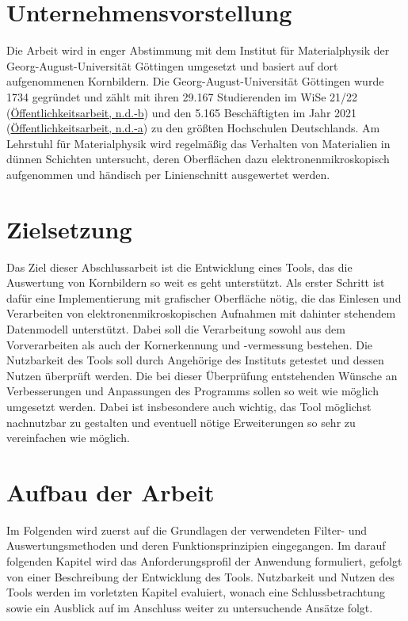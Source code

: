 \documentclass[
  12pt,
  openany]{book}
\begin{document}
\hypertarget{unternehmensvorstellung}{%
\section{Unternehmensvorstellung}\label{unternehmensvorstellung}}

Die Arbeit wird in enger Abstimmung mit dem Institut für Materialphysik der Georg-August-Universität Göttingen umgesetzt und basiert auf dort aufgenommenen Kornbildern.
Die Georg-August-Universität Göttingen wurde 1734 gegründet und zählt mit ihren 29.167 Studierenden im WiSe 21/22 (\protect\hyperlink{ref-offentlichkeitsarbeitStudiumUndLehre}{Öffentlichkeitsarbeit, n.d.-b}) und den 5.165 Beschäftigten im Jahr 2021 (\protect\hyperlink{ref-offentlichkeitsarbeitPersonalGeorgAugustUniversitatGottingen}{Öffentlichkeitsarbeit, n.d.-a}) zu den größten Hochschulen Deutschlands. Am Lehrstuhl für Materialphysik wird regelmäßig das Verhalten von Materialien in dünnen Schichten untersucht, deren Oberflächen dazu elektronenmikroskopisch aufgenommen und händisch per Linienschnitt ausgewertet werden.

\hypertarget{zielsetzung}{%
\section{Zielsetzung}\label{zielsetzung}}

Das Ziel dieser Abschlussarbeit ist die Entwicklung eines Tools, das die Auswertung von Kornbildern so weit es geht unterstützt.
Als erster Schritt ist dafür eine Implementierung mit grafischer Oberfläche nötig, die das Einlesen und Verarbeiten von elektronenmikroskopischen Aufnahmen mit dahinter stehendem Datenmodell unterstützt.
Dabei soll die Verarbeitung sowohl aus dem Vorverarbeiten als auch der Kornerkennung und -vermessung bestehen.
Die Nutzbarkeit des Tools soll durch Angehörige des Instituts getestet und dessen Nutzen überprüft werden. Die bei dieser Überprüfung entstehenden Wünsche an Verbesserungen und Anpassungen des Programms sollen so weit wie möglich umgesetzt werden.
Dabei ist insbesondere auch wichtig, das Tool möglichst nachnutzbar zu gestalten und eventuell nötige Erweiterungen so sehr zu vereinfachen wie möglich.

\hypertarget{aufbau-der-arbeit}{%
\section{Aufbau der Arbeit}\label{aufbau-der-arbeit}}

Im Folgenden wird zuerst auf die Grundlagen der verwendeten Filter- und Auswertungsmethoden und deren Funktionsprinzipien eingegangen.
Im darauf folgenden Kapitel wird das Anforderungsprofil der Anwendung formuliert, gefolgt von einer Beschreibung der Entwicklung des Tools.
Nutzbarkeit und Nutzen des Tools werden im vorletzten Kapitel evaluiert, wonach eine Schlussbetrachtung sowie ein Ausblick auf im Anschluss weiter zu untersuchende Ansätze folgt.
\end{document}
